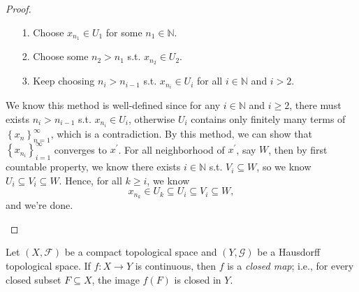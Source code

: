 \begin{proof}
\begin{itemize}
    \begin{itemize}
      \item [1.] Choose \(x_{n_1} \in U_1\) for some \(n_1 \in \mathbb{N} \).  
      \item [2.] Choose some \(n_2  > n_1\) s.t. \(x_{n_2} \in U_2\).   
      \item [3.] Keep choosing \(n_i > n_{i-1}\) s.t. \(x_{n_i} \in U_i\) for all \(i \in \mathbb{N} \) and \(i > 2\).  
    \end{itemize} 
    We know this method is well-defined since for any \(i \in \mathbb{N} \) and \(i \ge 2\), there must exists \(n_i > n_{i-1}\) s.t. \(x_{n_i} \in U_i\), otherwise \(U_i\) contains only finitely many terms of \(\left\{ x_n \right\}_{n=1}^{\infty}  \), which is a contradiction. By this method, we can show that \(\left\{ x_{n_i} \right\}_{i=1}^{\infty}  \) converges to \(x^{\prime} \). For all neighborhood of \(x^{\prime}\), say \(W\), then by first countable property, we know there exists \(i \in \mathbb{N} \) s.t. \(V_i \subseteq W\), so we know \(U_i \subseteq V_i \subseteq W\). Hence, for all \(k \ge i\), we know 
    \[
      x_{n_k} \in U_k \subseteq U_i \subseteq V_i \subseteq W,
    \] and we're done.
  \end{itemize} 
\end{proof}
\begin{problem}[15pts]
    Let $(X,\mathcal{F})$ be a compact topological space and $(Y,\mathcal{G})$ be a Hausdorff topological space. 
If $f:X\to Y$ is continuous, then $f$ is a \emph{closed map}; i.e., for every closed
subset $F\subseteq X$, the image $f(F)$ is closed in $Y$.
\end{problem}
